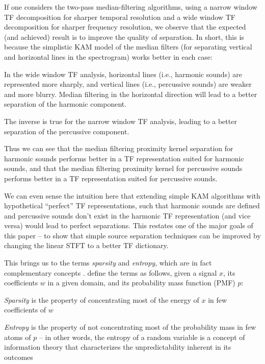 \documentclass[letter,12pt]{article}
\newenvironment{tight_itemize}{
\begin{itemize}
  \setlength{\itemsep}{0pt}
  \setlength{\parskip}{0pt}
}{\end{itemize}}
\begin{document}
If one considers the two-pass median-filtering algorithms, using a narrow window TF decomposition for sharper temporal resolution and a wide window TF decomposition for sharper frequency resolution, we observe that the expected (and achieved) result is to improve the quality of separation. In short, this is because the simplistic KAM model of the median filters (for separating vertical and horizontal lines in the spectrogram) works better in each case:

\begin{tight_itemize}
	\item
		In the wide window TF analysis, horizontal lines (i.e., harmonic sounds) are represented more sharply, and vertical lines (i.e., percussive sounds) are weaker and more blurry. Median filtering in the horizontal direction will lead to a better separation of the harmonic component.
	\item
		The inverse is true for the narrow window TF analysis, leading to a better separation of the percussive component.
\end{tight_itemize}

Thus we can see that the median filtering proximity kernel separation for harmonic sounds performs better in a TF representation suited for harmonic sounds, and that the median filtering proximity kernel for percussive sounds performs better in a TF representation suited for percussive sounds.

We can even sense the intuition here that extending simple KAM algorithms with hypothetical ``perfect'' TF representations, such that harmonic sounds are defined and percussive sounds don't exist in the harmonic TF representation (and vice versa) would lead to perfect separations. This restates one of the major goals of this paper -- to show that simple source separation techniques can be improved by changing the linear STFT to a better TF dictionary.

This brings us to the terms \textit{sparsity} and \textit{entropy}, which are in fact complementary concepts \cite{honeine2014entropy}. \citet{pastor2015mathematics} define the terms as follows, given a signal $x$, its coefficients $w$ in a given domain, and its probability mass function (PMF) $p$:
\begin{tight_itemize}
	\item
		\textit{Sparsity} is the property of concentrating most of the energy of $x$ in few coefficients of $w$
	\item
		\textit{Entropy} is the property of not concentrating most of the probability mass in few atoms of $p$ -- in other words, the entropy of a random variable is a concept of information theory that characterizes the unpredictability inherent in its outcomes
\end{tight_itemize}
\end{document}
